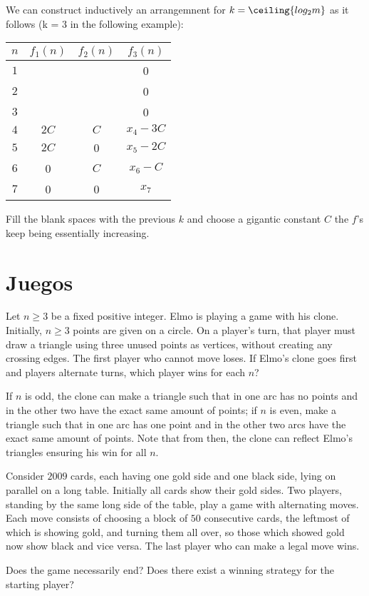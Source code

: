 We can construct inductively an arrangemnent for 
$k = \ceiling{log_2 m}$ as it follows 
(k = 3 in the following example): 
\begin{center}
  \begin{tabular}{c|c|c|c|}
    $n$ & $f_1(n)$ & $f_2(n)$ & $f_3(n)$ \\
    \hline 
    $1$ &  &  & 0 \\
    \hline
    $2$ &  &  & 0 \\  
    \hline
    $3$ &  &  & 0 \\
    \hline
    $4$ & $2C$ & $C$ & $x_4 -3C$ \\
    \hline
    $5$ & $2C$ & 0 & $x_5 -2C$ \\
    \hline
    $6$ & 0 & $C$ & $x_6 -C$ \\
    \hline
    $7$ & 0 & 0 & $x_7$ \\
    \hline
  \end{tabular}
\end{center}

Fill the blank spaces with the previous $k$ and choose a 
gigantic constant $C$ the $f$'s keep being essentially 
increasing.

\section{Juegos}

\begin{problem}
  Let $n \ge 3$ be a fixed positive integer.
  Elmo is playing a game with his clone.
  Initially, $n\geq 3$ points are given on a circle.
  On a player's turn, that player must draw a triangle
  using three unused points as vertices, without creating any crossing edges.
  The first player who cannot move loses.
  If Elmo's clone goes first and players alternate turns,
  which player wins for each $n$?
\end{problem}

If $n$ is odd, the clone can make a triangle such that in one arc has no 
points and in the other two have the exact same amount of points; 
if $n$ is even, make a triangle such that in one arc has 
one point and in the other two arcs have the exact same amount 
of points. Note that from then, the clone can reflect Elmo's 
triangles ensuring his win for all $n$.

\begin{problem}
  Consider $2009$ cards, each having one gold side and one black side,
  lying on parallel on a long table.
  Initially all cards show their gold sides.
  Two players, standing by the same long side of the table,
  play a game with alternating moves.
  Each move consists of choosing a block of $50$ consecutive cards,
  the leftmost of which is showing gold, and
  turning them all over,
  so those which showed gold now show black and vice versa.
  The last player who can make a legal move wins.

  \begin{enumerate}[(a)]
  \ii Does the game necessarily end?
  \ii Does there exist a winning strategy for the starting player?
  \end{enumerate}
\end{problem}

